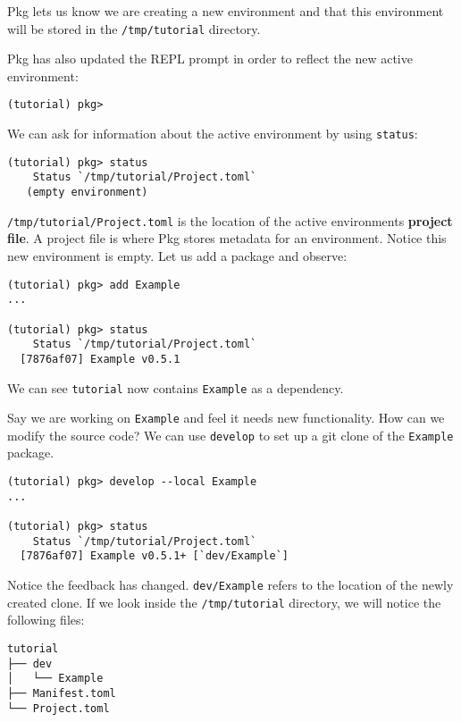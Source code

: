 Pkg lets us know we are creating a new environment and that this environment will be stored in the \texttt{/tmp/tutorial} directory.

Pkg has also updated the REPL prompt in order to reflect the new active environment:


\begin{verbatim}
(tutorial) pkg>
\end{verbatim}

We can ask for information about the active environment by using \texttt{status}:


\begin{verbatim}
(tutorial) pkg> status
    Status `/tmp/tutorial/Project.toml`
   (empty environment)
\end{verbatim}

\texttt{/tmp/tutorial/Project.toml} is the location of the active environment{\textquotesingle}s \textbf{project file}. A project file is where Pkg stores metadata for an environment. Notice this new environment is empty. Let us add a package and observe:


\begin{verbatim}
(tutorial) pkg> add Example
...

(tutorial) pkg> status
    Status `/tmp/tutorial/Project.toml`
  [7876af07] Example v0.5.1
\end{verbatim}

We can see \texttt{tutorial} now contains \texttt{Example} as a dependency.

Say we are working on \texttt{Example} and feel it needs new functionality. How can we modify the source code? We can use \texttt{develop} to set up a git clone of the \texttt{Example} package.


\begin{verbatim}
(tutorial) pkg> develop --local Example
...

(tutorial) pkg> status
    Status `/tmp/tutorial/Project.toml`
  [7876af07] Example v0.5.1+ [`dev/Example`]
\end{verbatim}

Notice the feedback has changed. \texttt{dev/Example} refers to the location of the newly created clone. If we look inside the \texttt{/tmp/tutorial} directory, we will notice the following files:


\begin{lstlisting}
tutorial
├── dev
│   └── Example
├── Manifest.toml
└── Project.toml
\end{lstlisting}

